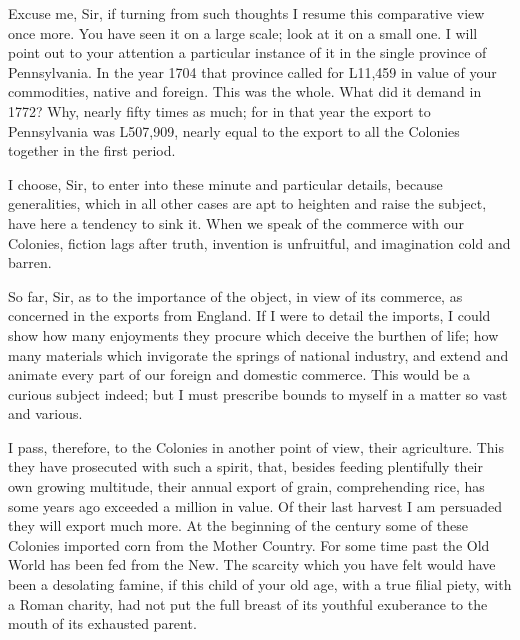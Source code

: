 Excuse me, Sir, if turning from such thoughts I resume this comparative view once more. You have seen it on a large scale; look at it on a small one. I will point out to your attention a particular instance of it in the single province of Pennsylvania. In the year 1704 that province called for L11,459 in value of your commodities, native and foreign. This was the whole. What did it demand in 1772? Why, nearly fifty times as much; for in that year the export to Pennsylvania was L507,909, nearly equal to the export to all the Colonies together in the first period.\par

I choose, Sir, to enter into these minute and particular details, because generalities, which in all other cases are apt to heighten and raise the subject, have here a tendency to sink it. When we speak of the commerce with our Colonies, fiction lags after truth, invention is unfruitful, and imagination cold and barren.\par

So far, Sir, as to the importance of the object, in view of its commerce, as concerned in the exports from England. If I were to detail the imports, I could show how many enjoyments they procure which deceive the burthen of life; how many materials which invigorate the springs of national industry, and extend and animate every part of our foreign and domestic commerce. This would be a curious subject indeed; but I must prescribe bounds to myself in a matter so vast and various.\par

I pass, therefore, to the Colonies in another point of view, their agriculture. This they have prosecuted with such a spirit, that, besides feeding plentifully their own growing multitude, their annual export of grain, comprehending rice, has some years ago exceeded a million in value. Of their last harvest I am persuaded they will export much more. At the beginning of the century some of these Colonies imported corn from the Mother Country. For some time past the Old World has been fed from the New. The scarcity which you have felt would have been a desolating famine, if this child of your old age, with a true filial piety, with a Roman charity, had not put the full breast of its youthful exuberance to the mouth of its exhausted parent.\par

